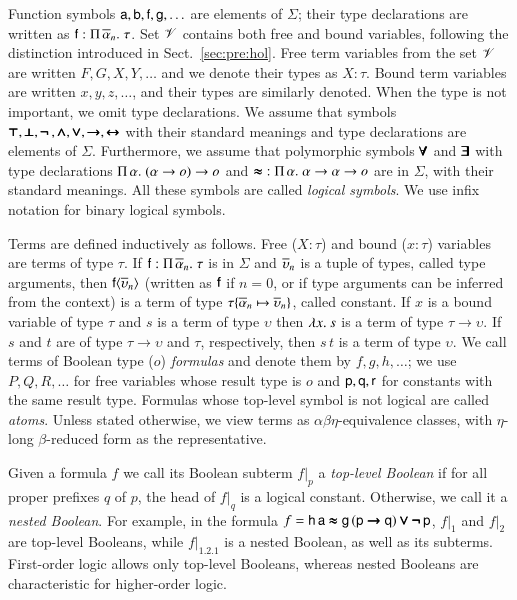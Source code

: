 Function symbols $\mathsf{a}, \mathsf{b}, \mathsf{f}, \mathsf{g}, \ldots$ are elements of
$\Sigma$; their type declarations are written as $\mathsf{f} :
\Pi\,\overline{\alpha}_{n}.\; \tau$. Set $\mathscr{V}$ contains both free and bound variables, following
the distinction introduced in Sect.~\ref{sec:pre:hol}. Free term variables from the set $\mathscr{V}$ are written
$F,G,X,Y, \ldots$ and we denote their types as $X : \tau$. Bound term variables are written $x,y,z,\ldots$,
and their types are similarly denoted. When the type is not
important, we omit type declarations. We assume that symbols $\pmb{\top},
\pmb{\bot},\pmb{\neg\,},\pmb{\land}, \pmb{\lor},\pmb{\rightarrow},\pmb{\leftrightarrow}$ with their standard meanings and type declarations are elements of
$\Sigma$. Furthermore, we assume that polymorphic symbols $\pmb{\forall}$ and $\pmb{\exists}$
with type declarations $\Pi\,\alpha.\; (\alpha \rightarrow o) \rightarrow o$
and $\pmb{\approx} \; : \Pi\,\alpha.\; {\alpha \rightarrow \alpha \rightarrow o}$ are
in $\Sigma$, with their standard meanings. All these symbols are called \emph{logical
symbols}. We use infix notation for binary logical symbols.

 Terms are defined inductively as follows. Free ($X : \tau$)  and bound ($x : \tau$) variables   are
terms of type $\tau$. If $\mathsf{f} : \Pi\,\overline{\alpha}_{n}.\; \tau$ is in
$\Sigma$ and $\overline{\upsilon}_{n}$ is a tuple of types, called type arguments, then
$\mathsf{f}{\langle\overline{\upsilon}_{n}\rangle}$ (written as $\mathsf{f}$ if $n=0$, or if type
arguments can be inferred from the context) is a term of type $\tau \{
\overline{\alpha}_{n} \mapsto \overline{\upsilon}_{n} \}$, called constant. If $x$ is a bound variable
of type $\tau$ and $s$ is a term of type $\upsilon$ then $\lambda x.\> s$ is a term of type
$\tau \rightarrow \upsilon$. If $s$ and $t$ are of type $\tau \rightarrow \upsilon$ and
$\tau$, respectively, then $s \, t$ is a term of type $\upsilon$. We call terms of
Boolean type ($o$) \emph{formulas} and denote them by $f,g,h, \ldots$; we use
$P,Q,R, \ldots$ for free variables whose result type is $o$ and
$\mathsf{p},\mathsf{q},\mathsf{r}$ for constants with the same result type.
%
Formulas whose top-level symbol is not logical are called \emph{atoms}.
Unless stated otherwise, we view terms as
$\alpha\beta\eta$-equivalence classes, with $\eta$-long $\beta$-reduced form as
the representative.

Given a formula $f$ we call its Boolean subterm $f|_p$ a \emph{top-level
Boolean} if for all proper prefixes $q$ of $p$, the head of $f|_q$ is a logical
constant. Otherwise, we call it a \emph{nested Boolean}. For example, in the
formula $f = \mathsf{h} \, \mathsf{a} \pmb{\approx} \mathsf{g} \, (\mathsf{p} \pmb{\rightarrow} \mathsf{q}) \pmb{\lor}
\pmb{\neg\,}\mathsf{p}$, $f|_1$ and $f|_2$ are top-level Booleans, while $f|_{1.2.1}$ is a
nested Boolean, as well as its subterms. First-order logic allows only top-level
Booleans, whereas nested Booleans are characteristic for higher-order logic. 

